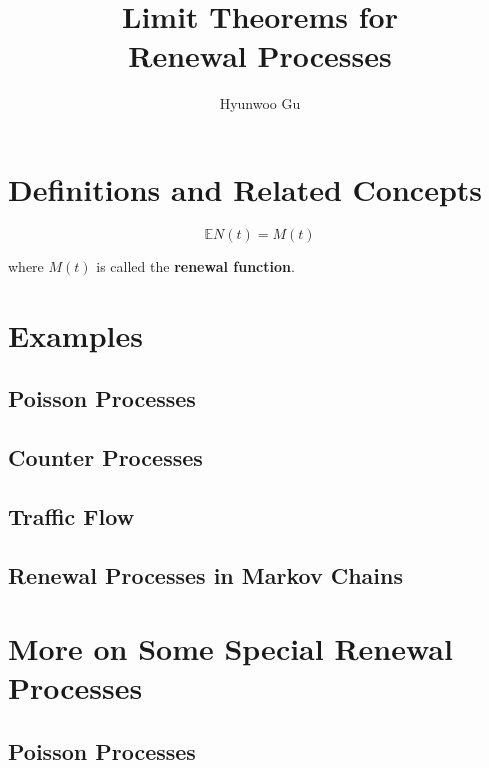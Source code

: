 \documentclass[12pt]{article}
\theoremstyle{nonumberbreak}
\begin{document}
\title{\textbf{Limit Theorems for \\ Renewal Processes}}
\author{Hyunwoo Gu}
\date{}

\maketitle


\section{Definitions and Related Concepts}

$$
\mathbb{E} N(t) = M(t)
$$

where $M(t)$ is called the \textbf{renewal function}.



\section{Examples}

\subsection{Poisson Processes}

\subsection{Counter Processes}

\subsection{Traffic Flow}

\subsection{Renewal Processes in Markov Chains}


\section{More on Some Special Renewal Processes}

\subsection{Poisson Processes}
\end{document}
